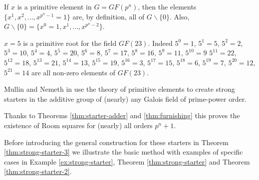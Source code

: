 If $x$ is a primitive element in $G = GF(p^n)$, then the elements $\{x^1, x^2, \ldots, x^{p^n - 1} = 1\}$ are, by definition, all of $G \backslash \{0\}$.
Also, $G \backslash \{0\} = \{x^0 = 1, x^1, \ldots, x^{p^n - 2}\}$.

\begin{example}[label=eg:mullin-nemeth]
$x = 5$ is a primitive root for the field $GF(23)$. Indeed $5^0 = 1$, $5^1 = 5$, $5^2 = 2$, $5^3 = 10$, $5^4 = 4$, $5^5 = 20$, $5^6 = 8$, $5^7 = 17$, $5^8 = 16$, $5^9 = 11$, $5^{10} = 9$ $5^{11} = 22$, $5^{12} = 18$, $5^{13} = 21$, $5^{14} = 13$, $5^{15} = 19$, $5^{16} = 3$, $5^{17} = 15$, $5^{18} = 6$, $5^{19} = 7$, $5^{20} = 12$, $5^{21} = 14$ are all non-zero elements of $GF(23)$.
\end{example}

Mullin and Nemeth in
\cite{mullinFurnishingRoomSquares1969}
use the theory of primitive elements to create strong starters in the additive group of (nearly) any Galois field of prime-power order.

Thanks to Theorems
\ref{thm:starter-adder}
and
\ref{thm:furnishing}
this proves the existence of Room squares for (nearly) all orders $p^n + 1$.

Before introducing the general construction for these starters in Theorem \ref{thm:strong-starter-3} we illustrate the basic method with examples of specific cases in Example \ref{ex:strong-starter}, Theorem \ref{thm:strong-starter} and Theorem \ref{thm:strong-starter-2}.

